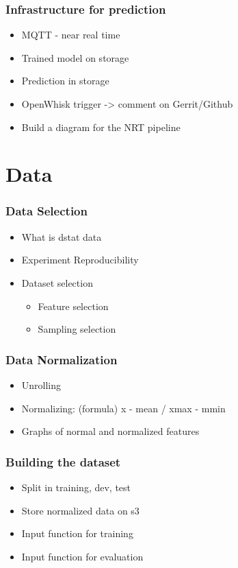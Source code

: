 \documentclass[aspectratio=169,11pt,hyperref={colorlinks=true}]{beamer}
\begin{document}
\begin{frame}
    \frametitle{Infrastructure for prediction}
    \begin{itemize}
        \item{MQTT - near real time}
        \item{Trained model on storage}
        \item{Prediction in storage}
        \item{OpenWhisk trigger -> comment on Gerrit/Github}
        \item{Build a diagram for the NRT pipeline}
    \end{itemize}
\end{frame}

\section{Data}
\begin{frame}
    \frametitle{Data Selection}
    \begin{itemize}
        \item{What is dstat data}
        \item{Experiment Reproducibility}
        \item{Dataset selection}
        \begin{itemize}
          \item{Feature selection}
          \item{Sampling selection}
        \end{itemize}
    \end{itemize}
\end{frame}

\begin{frame}
    \frametitle{Data Normalization}
    \begin{itemize}
        \item{Unrolling}
        \item{Normalizing: (formula) x - mean / xmax - mmin}
        \item{Graphs of normal and normalized features}
    \end{itemize}
\end{frame}

\begin{frame}
    \frametitle{Building the dataset}
    \begin{itemize}
        \item{Split in training, dev, test}
        \item{Store normalized data on s3}
        \item{Input function for training}
        \item{Input function for evaluation}
    \end{itemize}
\end{frame}
\end{document}
